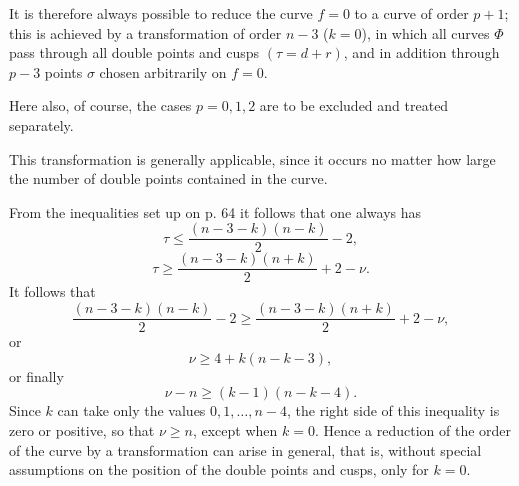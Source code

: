 \documentclass[10pt]{article}
\begin{document}
It is therefore always possible to reduce the curve \(f=0\) to a curve of order \(p+1\); this is achieved by a transformation of order \(n-3\) (\(k=0\)), in which all curves \(\Phi\) pass through all double points and cusps \((\tau=d+r)\), and in addition through \(p-3\) points \(\sigma\) chosen arbitrarily on \(f=0\).

Here also, of course, the cases \(p=0,1,2\) are to be excluded and treated separately.

This transformation is generally applicable, since it occurs no matter how large the number of double points contained in the curve.

From the inequalities set up on p. 64 it follows that one always has
\[
\tau\le \frac{(n-3-k)(n-k)}{2}-2,
\]
\[
\tau\ge \frac{(n-3-k)(n+k)}{2}+2-\nu.
\]
It follows that
\[
\frac{(n-3-k)(n-k)}{2}-2
\ge
\frac{(n-3-k)(n+k)}{2}+2-\nu,
\]
or
\[
\nu\ge 4+k(n-k-3),
\]
or finally
\[
\nu-n\ge (k-1)(n-k-4).
\]
Since \(k\) can take only the values \(0,1,\ldots,n-4\), the right side of this inequality is zero or positive, so that \(\nu\ge n\), except when \(k=0\). Hence a reduction of the order of the curve by a transformation can arise in general, that is, without special assumptions on the position of the double points and cusps, only for \(k=0\).
\end{document}
